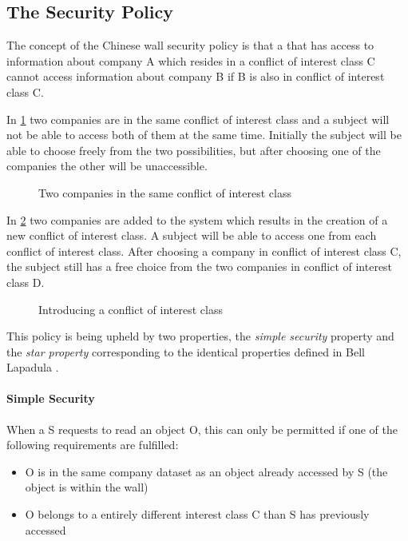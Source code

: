 \subsection{The Security Policy}
The concept of the Chinese wall security policy is that a \principal{} that has access to information about company A which resides in a conflict of interest class C cannot access information about company B if B is also in conflict of interest class C.

In \cref{conflict} two companies are in the same conflict of interest class and a subject will not be able to access both of them at the same time.
Initially the subject will be able to choose freely from the two possibilities, but after choosing one of the companies the other will be unaccessible.

\begin{figure}[h]
  \centering
\resizebox{0.3\textwidth}{!}{  
  
  }
  \caption{Two companies in the same conflict of interest class}
  \label{conflict}
\end{figure}

In \cref{conflict2} two companies are added to the system which results in the creation of a new conflict of interest class.
A subject will be able to access one from each conflict of interest class.
After choosing a company in conflict of interest class C, the subject still has a free choice from the two companies in conflict of interest class D.

\begin{figure}[h]
  \centering
  \resizebox{0.8\textwidth}{!}{
    
    }
  \caption{Introducing a conflict of interest class}
  \label{conflict2}
\end{figure}
This policy is being upheld by two properties, the \emph{simple security} property and the \emph{star property} corresponding to the identical properties defined in Bell Lapadula .

\paragraph{Simple Security}

When a \principal{} S requests to read an object O, this can only be permitted if one of the following requirements are fulfilled:

\begin{itemize}
\item O is in the same company dataset as an object already accessed by S (the object is within the wall)
\item O belongs to a entirely different interest class C than S has previously accessed
\end{itemize}

